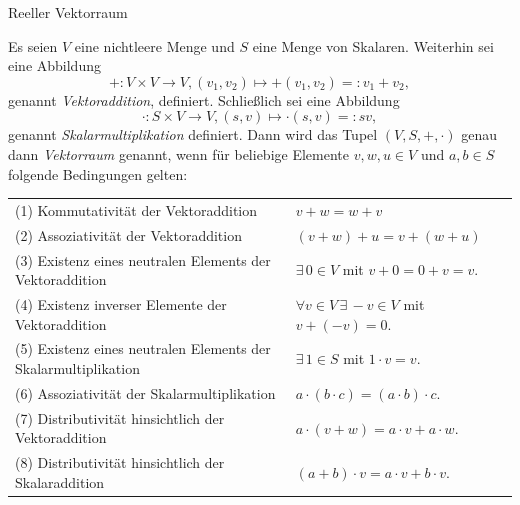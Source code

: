 \documentclass[
  8pt,
  ignorenonframetext,
]{beamer}
\begin{document}
\begin{frame}{Reeller Vektorraum}
\protect\hypertarget{reeller-vektorraum}{}
\footnotesize

\begin{definition}[Vektorraum]
\justifying
Es seien $V$ eine nichtleere Menge und $S$ eine Menge von Skalaren. Weiterhin sei
eine Abbildung
\begin{equation}
+ : V \times V \to V, (v_1,v_2) \mapsto +(v_1, v_2) =: v_1 + v_2,
\end{equation}
genannt \textit{Vektoraddition}, definiert. Schließlich sei eine Abbildung
\begin{equation}
\cdot : S \times V \to V, (s,v) \mapsto \cdot(s,v) =: sv,
\end{equation}
genannt \textit{Skalarmultiplikation} definiert. Dann wird das Tupel $(V,S,+,\cdot)$
genau dann \textit{Vektorraum} genannt, wenn für beliebige Elemente
$v,w,u\in V$ und $a,b \in S$ folgende Bedingungen gelten:
\vspace{2mm}
\begin{center}
\renewcommand{\arraystretch}{1.3}
\begin{tabular}{ll}
(1) Kommutativität der Vektoraddition
& $v + w = w + v$
\\
(2) Assoziativität der Vektoraddition
& $(v + w) + u = v + (w + u)$
\\
(3) Existenz eines neutralen Elements der Vektoraddition
& $\exists\, 0 \in V$ mit $v + 0 = 0 + v = v$.
\\
(4) Existenz inverser Elemente der Vektoraddition
& $\forall v \in V\, \exists\, -v \in V$ mit  $v + (-v) = 0$.
\\
(5) Existenz eines neutralen Elements der Skalarmultiplikation
& $\exists\, 1 \in S$ mit $1 \cdot v = v$.
\\
(6) Assoziativität der Skalarmultiplikation
& $a \cdot (b \cdot c) = (a \cdot b)\cdot c$.
\\
(7) Distributivität hinsichtlich der Vektoraddition
& $a\cdot (v + w) = a\cdot v + a \cdot w$.
\\
(8) Distributivität hinsichtlich der Skalaraddition
& $(a + b)\cdot v = a\cdot v + b\cdot v$.
\end{tabular}
\end{center}
\end{definition}
\end{frame}
\end{document}
